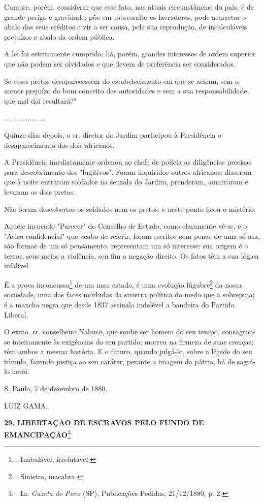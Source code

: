 Cumpre, porém, considerar que esse fato, nas atuais circunstâncias do
país, é de grande perigo e gravidade; põe em sobressalto os lavradores,
pode acarretar o abalo dos seus créditos e vir a ser causa, pela sua
reprodução, de incalculáveis prejuízos e abalo da ordem pública.

A lei foi estritamente cumprida; há, porém, grandes interesses de ordem
superior que não podem ser olvidados e que devem de preferência ser
considerados.

Se esses pretos desaparecessem do estabelecimento em que se acham, sem o
menor prejuízo do bom conceito das autoridades e sem a sua
responsabilidade, que mal daí resultará?"

.....................

Quinze dias depois, o sr. diretor do Jardim participou à Presidência o
desaparecimento dos dois africanos.

A Presidência imediatamente ordenou ao chefe de polícia as diligências
precisas para descobrimento dos "fugitivos". Foram inquiridos outros
africanos: disseram que à noite entraram soldados na senzala do Jardim,
prenderam, amarraram e levaram os dois pretos.

Não foram descobertos os soldados nem os pretos: e neste ponto ficou o
mistério.

Aquele invocado "Parecer" do Conselho de Estado, como claramente vê-se,
e o "Aviso-confidencial" que acabo de referir, foram escritos com penas
de uma só asa, são formas de um só pensamento, representam um só
interesse: sua origem é o terror, seus meios a violência, seu fim a
negação direito. Os fatos têm a sua lógica infalível.

É a prova inconcussa\footnote{. Inabalável, irrefutável.} de um mau
estado, é uma evolução lúgubre\footnote{. Sinistra, macabra.} da nossa
sociedade, uma das faces mórbidas da sinistra política do medo que a
sobrepuja; é a mancha negra que desde 1837 assinala indelével a bandeira
do Partido Liberal.

O exmo. sr. conselheiro Nabuco, que soube ser homem do seu tempo,
consagrou-se inteiramente às exigências do seu partido; morreu na
firmeza de suas crenças; têm ambos a mesma história. E o futuro, quando
julgá-lo, sobre a lápide do seu túmulo, fazendo justiça ao seu caráter,
perante a imagem da pátria, há de sagrá-lo herói.

S. Paulo, 7 de dezembro de 1880.

LUIZ GAMA.

\textbf{29. LIBERTAÇÃO DE ESCRAVOS PELO FUNDO DE EMANCIPAÇÃO}\footnote{.
  In: \emph{Gazeta do Povo} (SP), Publicações Pedidas, 21/12/1880, p. 2.}

